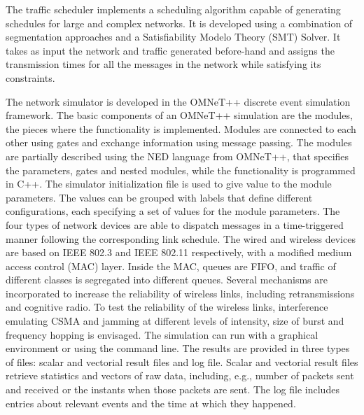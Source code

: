 \documentclass[conference]{IEEEtran}
\begin{document}

The traffic scheduler implements a scheduling algorithm capable of generating schedules for large and complex networks. It is developed using a combination of segmentation approaches and a Satisfiability Modelo Theory (SMT) Solver. It takes as input the network and traffic generated before-hand and assigns the transmission times for all the messages in the network while satisfying its constraints.

The network simulator is developed in the OMNeT++ discrete event simulation framework. The basic components of an OMNeT++ simulation are the modules, the pieces where the functionality is implemented. Modules are connected to each other using gates and exchange information using message passing. The modules are partially described using the NED language from OMNeT++, that specifies the parameters, gates and nested modules, while the functionality is programmed in C++. The simulator initialization file is used to give value to the module parameters. The values can be grouped with labels that define different configurations, each specifying a set of values for the module parameters. The four types of network devices are able to dispatch messages in a time-triggered manner following the corresponding link schedule. The wired and wireless devices are based on IEEE 802.3 and IEEE 802.11 respectively, with a modified medium access control (MAC) layer. Inside the MAC, queues are FIFO, and traffic of different classes is segregated into different queues. Several mechanisms are incorporated to increase the reliability of wireless links, including retransmissions and cognitive radio. To test the reliability of the wireless links, interference emulating CSMA and jamming at different levels of intensity, size of burst and frequency hopping is envisaged. The simulation can run with a graphical environment or using the command line. The results are provided in three types of files: scalar and vectorial result files and log file. Scalar and vectorial result files retrieve statistics and vectors of raw data, including, e.g., number of packets sent and received or the instants when those packets are sent. The log file includes entries about relevant events and the time at which they happened.
\end{document}
